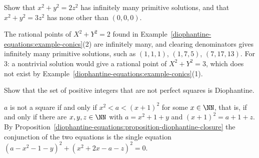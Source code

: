 \begin{exercise}\label{diophantine-equations:exercise-two-squares-conic}
Show that $x^2 + y^2 = 2z^2$ has infinitely many primitive solutions, and that $x^2 + y^2 = 3z^2$ has none other than $(0, 0, 0)$.
\end{exercise}

\begin{solution}
The rational points of $X^2 + Y^2 = 2$ found in Example~\ref{diophantine-equations:example-conics}(2) are infinitely many, and clearing denominators gives infinitely many primitive solutions, such as
$(1, 1, 1)$, $(1, 7, 5)$, $(7, 17, 13)$. For $3$: a nontrivial solution would give a rational point of $X^2 + Y^2 = 3$, which does not exist by Example~\ref{diophantine-equations:example-conics}(1).
\end{solution}

\begin{exercise}\label{diophantine-equations:exercise-not-square-diophantine}
Show that the set of positive integers that are not perfect squares is Diophantine.
\end{exercise}

\begin{solution}
$a$ is not a square if and only if $x^2 < a < (x + 1)^2$ for some $x \in \NN$, that is, if and only if there are $x, y, z \in \NN$ with $a = x^2 + 1 + y$ and $(x + 1)^2 = a + 1 + z$. By
Proposition~\ref{diophantine-equations:proposition-diophantine-closure} the conjunction of the two equations is the single equation $(a - x^2 - 1 - y)^2 + (x^2 + 2x - a - z)^2 = 0$.
\end{solution}
